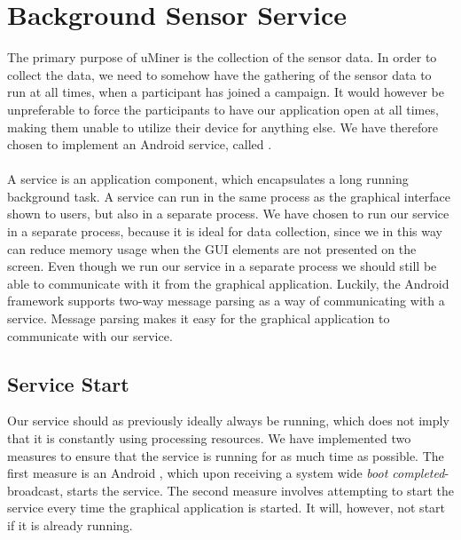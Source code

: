 
\section{Background Sensor Service}
\label{sec:background_sensor_service}

The primary purpose of uMiner is the collection of the sensor data. In order to collect the data, we need to somehow have the gathering of the sensor data to run at all times, when a participant has joined a campaign. It would however be unpreferable to force the participants to have our application open at all times, making them unable to utilize their device for anything else. We have therefore chosen to implement an Android service, called . 
\\\\
A service is an application component, which encapsulates a long running background task. A service can run in the same process as the graphical interface shown to users, but also in a separate process. We have chosen to run our service in a separate process, because it is ideal for data collection, since we in this way can reduce memory usage when the GUI elements are not presented on the screen. Even though we run our service in a separate process we should still be able to communicate with it from the graphical application. Luckily, the Android framework supports two-way message parsing as a way of communicating with a service. Message parsing makes it easy for the graphical application to communicate with our service.

\subsection{Service Start}
\label{sub:service_start}
Our service should as previously ideally always be running, which does not imply that it is constantly using processing resources. We have implemented two measures to ensure that the service is running for as much time as possible. The first measure is an Android , which upon receiving a system wide \emph{boot completed}-broadcast, starts the service. The second measure involves attempting to start the service every time the graphical application is started. It will, however, not start if it is already running.

